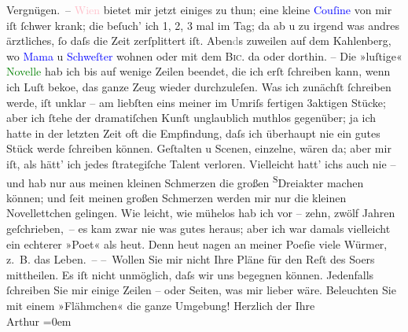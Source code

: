                     Vergnügen. –\pend
           \pstart
           \textcolor{pink}{Wien}{}\ledrightnote{\textcolor{pink}{Wien}} bietet mir jetzt einiges zu thun; eine
                    kleine \textcolor{blue}{Couſine}{} von mir iſt ſchwer krank;
                    die beſuch’ ich 1, 2, 3 mal im Tag; da{\geminationn} ab u zu
                    irgend was andres ärztliches, ſo daſs die Zeit zerſplittert iſt.
                        Aben\textcolor{gray}{d}s zuweilen auf dem Kahlenberg, wo \textcolor{blue}{Mama}{} u \textcolor{blue}{Schweſter}{}
                    wohnen oder mit dem \textsc{Bic.} da oder dorthin.\pend
           \pstart
           {\pb}– Die »luſtige« \textcolor{green}{Novelle}{} hab ich bis auf wenige Zeilen beendet, die ich erſt ſchreiben
                    kann, wenn ich Luſt beko{\geminationm}e, das ganze Zeug wieder
                    durchzuleſen. Was ich zunächſt ſchreiben werde, iſt unklar – am liebſten eins
                    meiner im Umriſs fertigen 3aktigen Stücke; aber ich ſtehe der dramatiſchen Kunſt
                    unglaublich muthlos gegenüber; ja ich hatte in der letzten Zeit oft die
                    Empfindung, daſs ich überhaupt nie {\pb}ein gutes
                    Stück werde ſchreiben können. Geſtalten u Scenen, einzelne, wären da; aber mir
                    iſt, als hätt’ ich jedes ſtrategiſche Talent verloren. Vielleicht hatt’ ichs
                    auch nie – und hab nur aus meinen kleinen Schmerzen die großen \substVorne{}\textsuperscript{S}\substDazwischen{}D\substHinten{}reiakter machen können; und ſeit meinen großen Schmerzen  werden mir nur die kleinen Novellettchen
                    gelingen. Wie leicht, wie mühelos hab ich vor – zehn, zwölf Jahren
                    geſchrieben, – {\pb}es kam zwar nie was gutes heraus;
                    aber ich war damals vielleicht ein echterer »Poet« als heut. Denn heut nagen an
                    meiner Poeſie viele Würmer, z. B. das Leben. –\pend
           \pstart
           – Wollen Sie mir nicht Ihre Pläne für den Reſt des So{\geminationm}ers mittheilen. Es iſt nicht unmöglich, daſs wir uns begegnen können.
                    Jedenfalls ſchreiben Sie mir einige Zeilen – oder Seiten, was mir lieber wäre.
                    Beleuchten {\pb}Sie mit einem »Flähmchen« die ganze
                    Umgebung!\pend
           \pstart
           Herzlich der Ihre{\\[\baselineskip]}\spacefill\mbox{Arthur}\pend
           \leftskip=0em{}\endnumbering{}  
      